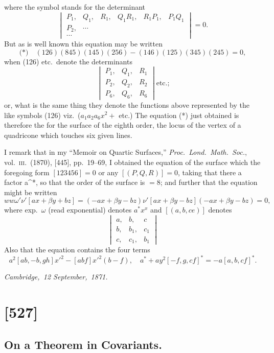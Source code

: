 \documentclass[11pt,a4paper]{book}
\begin{document}
\noindent
where the symbol stands for the determinant
\[
\begin{vmatrix}
P_1, & Q_1, & R_1, & Q_1 R_1, & R_1 P_1, & P_1 Q_1 \\
P_2, & \cdots & \\
\cdots &
\end{vmatrix} = 0.
\]
But as is well known this equation may be written
\[
\text{(*)}\quad (126)(845)(145)(256) - (146)(125)(345)(245) = 0,
\]
when (126) etc.\ denote the determinants
\[
\begin{vmatrix}
P_1, & Q_1, & R_1 \\
P_2, & Q_2, & R_2 \\
P_6, & Q_6, & R_6
\end{vmatrix} \text{etc.;}
\]
or, what is the same thing they denote the functions above represented by the like
symbols (126) viz.\ ($a_1 a_2 a_6 x^2 + $ etc.) The equation (*) just obtained is therefore the
for the surface of the eighth order, the locus of the vertex of a quadricone which
touches six given lines.

I remark that in my ``Memoir on Quartic Surfaces,'' \textit{Proc.\ Lond.\ Math.\ Soc.}, vol.\ \textsc{iii}.\
(1870), [445], pp.\ 19--69, I obtained the equation of the surface which the foregoing
form $[123456] = 0$ or any $[(P, Q, R)] = 0$, taking that there a factor a^*, so that
the order of the surface is $= 8$; and further that the equation might be written
\[
ww \omega'\nu' [a x + \beta y + b z] = (-a x + \beta y - b z) \nu' [a x + \beta y - b z](-a x + \beta y - b z) = 0,
\]
where exp.\ $\omega$ (read exponential) denotes $a^* x^x$ and $[(a, b, ce)]$ denotes
\[
\begin{vmatrix}
a, & b, & c \\
b, & b_1, & c_1 \\
c, & c_1, & b_1
\end{vmatrix}
\]
Also that the equation contains the four terms
\[
a^2 [ab, -b, gh] x'^2 - [a b f] x'^2 (b - f), \quad a^* + a y^2 [-f, g, c f]^* = -a [a, b, c f]^*.
\]

\noindent\textit{Cambridge,\ 12 September,\ 1871.}

\clearpage

\section{[527]}
\subsection{On a Theorem in Covariants.}
\end{document}
